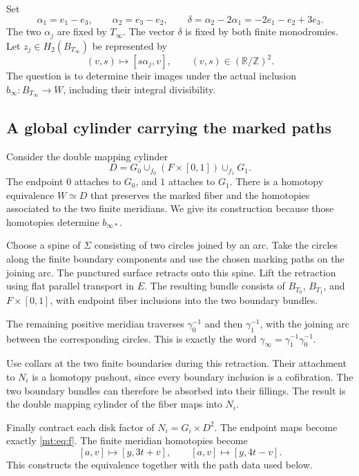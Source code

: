 Set
\begin{equation}\label{mt:eq:alpha}
\alpha_1=e_1-e_3,\qquad \alpha_2=e_3-e_2,\qquad
\delta=\alpha_2-2\alpha_1=-2e_1-e_2+3e_3.
\end{equation}
The two $\alpha_j$ are fixed by $T_\infty$.
The vector $\delta$ is fixed by both finite monodromies.
Let $z_j\in H_2(B_{T_\infty})$ be represented by
\begin{equation}\label{mt:eq:z}
(v,s)\longmapsto[s\alpha_j,v],\qquad (v,s)\in(\mathbb R/\mathbb Z)^2.
\end{equation}
The question is to determine their images under the actual inclusion
$b_\infty:B_{T_\infty}\to W$, including their integral divisibility.

\subsection{A global cylinder carrying the marked paths}

Consider the double mapping cylinder
\begin{equation}\label{mt:eq:double}
D=G_0\cup_{f_0}(F\times[0,1])\cup_{f_1}G_1.
\end{equation}
The endpoint $0$ attaches to $G_0$, and $1$ attaches to $G_1$.
There is a homotopy equivalence $W\simeq D$ that preserves the marked
fiber and the homotopies associated to the two finite meridians.
We give its construction because those homotopies determine $b_{\infty*}$.

Choose a spine of $\Sigma$ consisting of two circles joined by an arc.
Take the circles along the finite boundary components and use the chosen
marking paths on the joining arc.
The punctured surface retracts onto this spine.
Lift the retraction using flat parallel transport in $E$.
The resulting bundle consists of $B_{T_0}$, $B_{T_1}$, and $F\times[0,1]$,
with endpoint fiber inclusions into the two boundary bundles.

The remaining positive meridian traverses $\gamma_0^{-1}$ and then
$\gamma_1^{-1}$, with the joining arc between the corresponding circles.
This is exactly the word $\gamma_\infty=\gamma_1^{-1}\gamma_0^{-1}$.

Use collars at the two finite boundaries during this retraction.
Their attachment to $N_i$ is a homotopy pushout, since every boundary
inclusion is a cofibration.
The two boundary bundles can therefore be absorbed into their fillings.
The result is the double mapping cylinder of the fiber maps into $N_i$.

Finally contract each disk factor of $N_i=G_i\times D^2$.
The endpoint maps become exactly \eqref{mt:eq:f}.
The finite meridian homotopies become
\begin{equation}\label{mt:eq:homotopies}
[a,v]\longmapsto[y,3t+v],\qquad
[a,v]\longmapsto[y,4t-v].
\end{equation}
This constructs the equivalence together with the path data used below.

